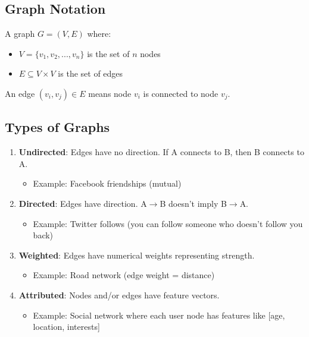 \documentclass[12pt,a4paper]{article}
\begin{document}
\subsection{Graph Notation}

\begin{mathbox}
A graph $G = (V, E)$ where:
\begin{itemize}
    \item $V = \{v_1, v_2, ..., v_n\}$ is the set of $n$ nodes
    \item $E \subseteq V \times V$ is the set of edges
\end{itemize}

An edge $(v_i, v_j) \in E$ means node $v_i$ is connected to node $v_j$.
\end{mathbox}

\subsection{Types of Graphs}

\begin{enumerate}
    \item \textbf{Undirected}: Edges have no direction. If A connects to B, then B connects to A.
    \begin{itemize}
        \item Example: Facebook friendships (mutual)
    \end{itemize}

    \item \textbf{Directed}: Edges have direction. A$\rightarrow$B doesn't imply B$\rightarrow$A.
    \begin{itemize}
        \item Example: Twitter follows (you can follow someone who doesn't follow you back)
    \end{itemize}

    \item \textbf{Weighted}: Edges have numerical weights representing strength.
    \begin{itemize}
        \item Example: Road network (edge weight = distance)
    \end{itemize}

    \item \textbf{Attributed}: Nodes and/or edges have feature vectors.
    \begin{itemize}
        \item Example: Social network where each user node has features like [age, location, interests]
    \end{itemize}
\end{enumerate}
\end{document}

